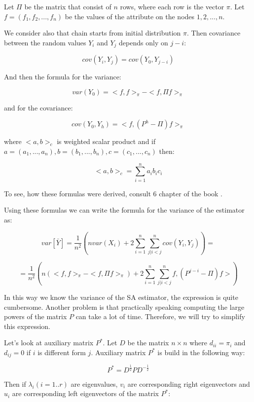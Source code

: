 \documentclass[12pt]{report}
\begin{document}
Let $\Pi$ be the matrix that consist of $n$ rows, where each row is the vector $\pi$. Let $f = (f_1 , f_2, ..., f_n)$ be the values of the attribute on the nodes $1, 2, ..., n$.

We consider also that chain starts from initial distribution $\pi$. Then covariance between the random values $Y_i$ and $Y_j$ depends only on $j-i$:

$$cov(Y_i, Y_j) = cov (Y_0, Y_{j-i})$$

And then the formula for the variance:

$$var(Y_0) = <f, f>_{\pi} - <f, \Pi f>_{\pi}$$

and for the covariance:

$$cov(Y_0, Y_h) = <f, (P^h - \Pi)f>_{\pi}$$

where $<a,b>_c$ is weighted scalar product and if $a = (a_1, ..., a_n), b = (b_1, ..., b_n), c = (c_1, ..., c_n)$ then:

$$<a,b>_c = \sum_{i = 1}^n a_i b_i c_i$$

To see, how these formulas were derived, consult 6 chapter of the book \cite{bremaud2013markov}.



Using these formulas we can write the formula for the variance of the estimator as:

$$ var\left[\bar{Y} \right] = \frac{1}{n^2} \left( nvar(X_i) + 2\sum_{i=1}^n \sum_{j|i < j}^n cov(Y_i, Y_j)\right) = $$

\begin{equation}\label{eq:varGen}
 = \frac{1}{n^2} \left( n(<f, f>_{\pi} - <f, \Pi f>_{\pi}) + 2\sum_{i=1}^n \sum_{j|i < j}^n  f, (P^{j-i} - \Pi)f> \right)
\end{equation}

In this way we know the variance of the SA estimator, the expression is quite cumbersome. Another problem is that practically speaking computing the large powers of the matrix $P$ can take a lot of time. Therefore, we will try to simplify this expression. 

Let's look at auxiliary matrix $P^*$. Let $D$ be the matrix $n \times n$ where $d_{ii} = \pi_i$ and $d_{ij} = 0$ if $i$ is different form $j$. Auxiliary matrix $P^*$ is build in the following way:

$$P^* = D^{\frac{1}{2}} P D^{-\frac{1}{2}}$$


Then if $\lambda_i (i=1..r)$ are eigenvalues, $v_i$ are corresponding right eigenvectors and $u_i$ are corresponding left eigenvectors of the matrix $P^*$:
\end{document}
